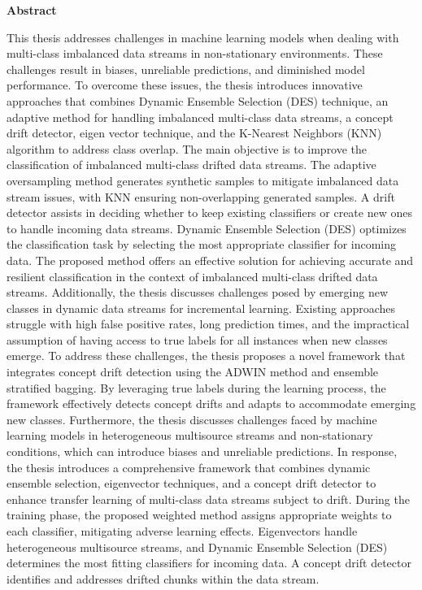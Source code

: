 




\begin{alwayssingle} \pagestyle{empty}\begin{center}
    \vspace*{1.5cm}
    {\Large \bfseries  Abstract}
  \end{center}      %
    This thesis addresses challenges in machine learning models when dealing with multi-class imbalanced data streams in non-stationary environments. These challenges result in biases, unreliable predictions, and diminished model performance. To overcome these issues, the thesis introduces innovative approaches that combines Dynamic Ensemble Selection (DES) technique, an adaptive method for handling imbalanced multi-class data streams, a concept drift detector, eigen vector technique, and the K-Nearest Neighbors (KNN) algorithm to address class overlap.
    The main objective is to improve the classification of imbalanced multi-class drifted data streams. The adaptive oversampling method generates synthetic samples to mitigate imbalanced data stream issues, with KNN ensuring non-overlapping generated samples. A drift detector assists in deciding whether to keep existing classifiers or create new ones to handle incoming data streams. Dynamic Ensemble Selection (DES) optimizes the classification task by selecting the most appropriate classifier for incoming data. The proposed method offers an effective solution for achieving accurate and resilient classification in the context of imbalanced multi-class drifted data streams. 
    Additionally, the thesis discusses challenges posed by emerging new classes in dynamic data streams for incremental learning. Existing approaches struggle with high false positive rates, long prediction times, and the impractical assumption of having access to true labels for all instances when new classes emerge. To address these challenges, the thesis proposes a novel framework that integrates concept drift detection using the ADWIN method and ensemble stratified bagging. By leveraging true labels during the learning process, the framework effectively detects concept drifts and adapts to accommodate emerging new classes. 
    Furthermore, the thesis discusses challenges faced by machine learning models in heterogeneous multisource streams and non-stationary conditions, which can introduce biases and unreliable predictions. In response, the thesis introduces a comprehensive framework that combines dynamic ensemble selection, eigenvector techniques, and a concept drift detector to enhance transfer learning of multi-class data streams subject to drift. During the training phase, the proposed weighted method assigns appropriate weights to each classifier, mitigating adverse learning effects. Eigenvectors handle heterogeneous multisource streams, and Dynamic Ensemble Selection (DES) determines the most fitting classifiers for incoming data. A concept drift detector identifies and addresses drifted chunks within the data stream.

\end{alwayssingle}
